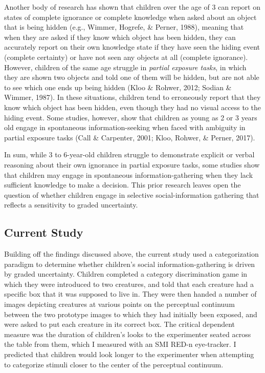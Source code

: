 \documentclass[,man,floatsintext]{apa6}
\begin{document}
Another body of research has shown that children over the age of 3 can report on states of complete ignorance or complete knowledge when asked about an object that is being hidden (e.g., Wimmer, Hogrefe, \& Perner, 1988), meaning that when they are asked if they know which object has been hidden, they can accurately report on their own knowledge state if they have seen the hiding event (complete certainty) or have not seen any objects at all (complete ignorance). However, children of the same age struggle in \emph{partial exposure tasks}, in which they are shown two objects and told one of them will be hidden, but are not able to see which one ends up being hidden (Kloo \& Rohwer, 2012; Sodian \& Wimmer, 1987). In these situations, children tend to erroneously report that they know which object has been hidden, even though they had no visual access to the hiding event. Some studies, however, show that children as young as 2 or 3 years old engage in spontaneous information-seeking when faced with ambiguity in partial exposure tasks (Call \& Carpenter, 2001; Kloo, Rohwer, \& Perner, 2017).

In sum, while 3 to 6-year-old children struggle to demonstrate explicit or verbal reasoning about their own ignorance in partial exposure tasks, some studies show that children may engage in spontaneous information-gathering when they lack sufficient knowledge to make a decision. This prior research leaves open the question of whether children engage in selective social-information gathering that reflects a sensitivity to graded uncertainty.

\hypertarget{current-study}{%
\subsection{Current Study}\label{current-study}}

Building off the findings discussed above, the current study used a categorization paradigm to determine whether children's social information-gathering is driven by graded uncertainty. Children completed a category discrimination game in which they were introduced to two creatures, and told that each creature had a specific box that it was supposed to live in. They were then handed a number of images depicting creatures at various points on the perceptual continuum between the two prototype images to which they had initially been exposed, and were asked to put each creature in its correct box. The critical dependent measure was the duration of children's looks to the experimenter seated across the table from them, which I measured with an SMI RED-n eye-tracker. I predicted that children would look longer to the experimenter when attempting to categorize stimuli closer to the center of the perceptual continuum.
\end{document}
